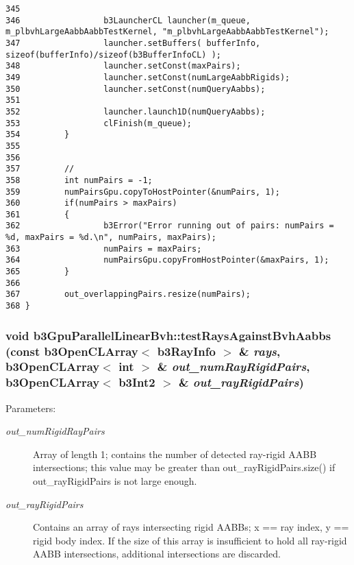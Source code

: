 \begin{Code}
\begin{verbatim}
345                 
346                 b3LauncherCL launcher(m_queue, m_plbvhLargeAabbAabbTestKernel, "m_plbvhLargeAabbAabbTestKernel");
347                 launcher.setBuffers( bufferInfo, sizeof(bufferInfo)/sizeof(b3BufferInfoCL) );
348                 launcher.setConst(maxPairs);
349                 launcher.setConst(numLargeAabbRigids);
350                 launcher.setConst(numQueryAabbs);
351                 
352                 launcher.launch1D(numQueryAabbs);
353                 clFinish(m_queue);
354         }
355         
356         
357         //
358         int numPairs = -1;
359         numPairsGpu.copyToHostPointer(&numPairs, 1);
360         if(numPairs > maxPairs)
361         {
362                 b3Error("Error running out of pairs: numPairs = %d, maxPairs = %d.\n", numPairs, maxPairs);
363                 numPairs = maxPairs;
364                 numPairsGpu.copyFromHostPointer(&maxPairs, 1);
365         }
366         
367         out_overlappingPairs.resize(numPairs);
368 }
\end{verbatim}
\end{Code}


\hypertarget{classb3_gpu_parallel_linear_bvh_a2e73543c39fe8a8ba65394fbc33e8bb}{
\subsubsection[testRaysAgainstBvhAabbs]{\setlength{\rightskip}{0pt plus 5cm}void b3GpuParallelLinearBvh::testRaysAgainstBvhAabbs (const b3OpenCLArray$<$ b3RayInfo $>$ \& {\em rays}, \/  b3OpenCLArray$<$ int $>$ \& {\em out\_\-numRayRigidPairs}, \/  b3OpenCLArray$<$ b3Int2 $>$ \& {\em out\_\-rayRigidPairs})}}
\label{classb3_gpu_parallel_linear_bvh_a2e73543c39fe8a8ba65394fbc33e8bb}


\begin{Desc}
\item[Parameters:]
\begin{description}
\item[{\em out\_\-numRigidRayPairs}]Array of length 1; contains the number of detected ray-rigid AABB intersections; this value may be greater than out\_\-rayRigidPairs.size() if out\_\-rayRigidPairs is not large enough. \item[{\em out\_\-rayRigidPairs}]Contains an array of rays intersecting rigid AABBs; x == ray index, y == rigid body index. If the size of this array is insufficient to hold all ray-rigid AABB intersections, additional intersections are discarded. \end{description}
\end{Desc}


